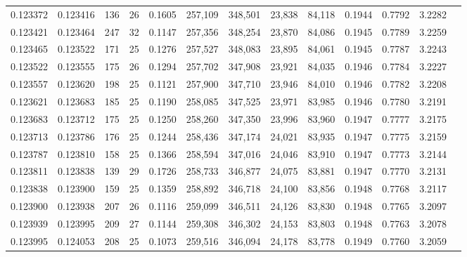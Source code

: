 \begin{tabular}{rrrrrrrrrrrrr}
0.123372 & 0.123416 & 136 &  26 &                                     0.1605 & 257,109 & 348,501 &  23,838 &  84,118 & 0.1944 & 0.7792 & 3.2282 \\
0.123421 & 0.123464 & 247 &  32 &                                     0.1147 & 257,356 & 348,254 &  23,870 &  84,086 & 0.1945 & 0.7789 & 3.2259 \\
0.123465 & 0.123522 & 171 &  25 &                                     0.1276 & 257,527 & 348,083 &  23,895 &  84,061 & 0.1945 & 0.7787 & 3.2243 \\
0.123522 & 0.123555 & 175 &  26 &                                     0.1294 & 257,702 & 347,908 &  23,921 &  84,035 & 0.1946 & 0.7784 & 3.2227 \\
0.123557 & 0.123620 & 198 &  25 &                                     0.1121 & 257,900 & 347,710 &  23,946 &  84,010 & 0.1946 & 0.7782 & 3.2208 \\
0.123621 & 0.123683 & 185 &  25 &                                     0.1190 & 258,085 & 347,525 &  23,971 &  83,985 & 0.1946 & 0.7780 & 3.2191 \\
0.123683 & 0.123712 & 175 &  25 &                                     0.1250 & 258,260 & 347,350 &  23,996 &  83,960 & 0.1947 & 0.7777 & 3.2175 \\
0.123713 & 0.123786 & 176 &  25 &                                     0.1244 & 258,436 & 347,174 &  24,021 &  83,935 & 0.1947 & 0.7775 & 3.2159 \\
0.123787 & 0.123810 & 158 &  25 &                                     0.1366 & 258,594 & 347,016 &  24,046 &  83,910 & 0.1947 & 0.7773 & 3.2144 \\
0.123811 & 0.123838 & 139 &  29 &                                     0.1726 & 258,733 & 346,877 &  24,075 &  83,881 & 0.1947 & 0.7770 & 3.2131 \\
0.123838 & 0.123900 & 159 &  25 &                                     0.1359 & 258,892 & 346,718 &  24,100 &  83,856 & 0.1948 & 0.7768 & 3.2117 \\
0.123900 & 0.123938 & 207 &  26 &                                     0.1116 & 259,099 & 346,511 &  24,126 &  83,830 & 0.1948 & 0.7765 & 3.2097 \\
0.123939 & 0.123995 & 209 &  27 &                                     0.1144 & 259,308 & 346,302 &  24,153 &  83,803 & 0.1948 & 0.7763 & 3.2078 \\
0.123995 & 0.124053 & 208 &  25 &                                     0.1073 & 259,516 & 346,094 &  24,178 &  83,778 & 0.1949 & 0.7760 & 3.2059 \\

\end{tabular}
